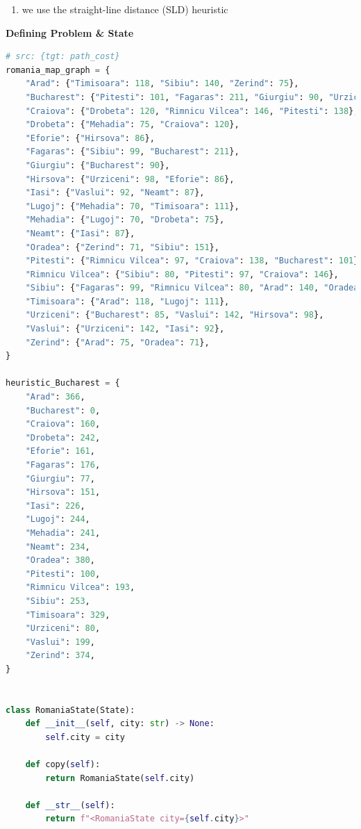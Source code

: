\begin{enumerate}[itemsep=0.2cm]
    \item we use the straight-line distance (SLD) heuristic
    \hfill \cite{ai/book/Artificial-Intelligence-A-Modern-Approach/Russell-Norvig}
\end{enumerate}


\vspace{0.5cm}

{\centering \textbf{Defining Problem \& State} \par}

\begin{lstlisting}[language=Python]
# src: {tgt: path_cost}
romania_map_graph = {
    "Arad": {"Timisoara": 118, "Sibiu": 140, "Zerind": 75},
    "Bucharest": {"Pitesti": 101, "Fagaras": 211, "Giurgiu": 90, "Urziceni": 85},
    "Craiova": {"Drobeta": 120, "Rimnicu Vilcea": 146, "Pitesti": 138},
    "Drobeta": {"Mehadia": 75, "Craiova": 120},
    "Eforie": {"Hirsova": 86},
    "Fagaras": {"Sibiu": 99, "Bucharest": 211},
    "Giurgiu": {"Bucharest": 90},
    "Hirsova": {"Urziceni": 98, "Eforie": 86},
    "Iasi": {"Vaslui": 92, "Neamt": 87},
    "Lugoj": {"Mehadia": 70, "Timisoara": 111},
    "Mehadia": {"Lugoj": 70, "Drobeta": 75},
    "Neamt": {"Iasi": 87},
    "Oradea": {"Zerind": 71, "Sibiu": 151},
    "Pitesti": {"Rimnicu Vilcea": 97, "Craiova": 138, "Bucharest": 101},
    "Rimnicu Vilcea": {"Sibiu": 80, "Pitesti": 97, "Craiova": 146},
    "Sibiu": {"Fagaras": 99, "Rimnicu Vilcea": 80, "Arad": 140, "Oradea": 151},
    "Timisoara": {"Arad": 118, "Lugoj": 111},
    "Urziceni": {"Bucharest": 85, "Vaslui": 142, "Hirsova": 98},
    "Vaslui": {"Urziceni": 142, "Iasi": 92},
    "Zerind": {"Arad": 75, "Oradea": 71},
}

heuristic_Bucharest = {
    "Arad": 366,
    "Bucharest": 0,
    "Craiova": 160,
    "Drobeta": 242,
    "Eforie": 161,
    "Fagaras": 176,
    "Giurgiu": 77,
    "Hirsova": 151,
    "Iasi": 226,
    "Lugoj": 244,
    "Mehadia": 241,
    "Neamt": 234,
    "Oradea": 380,
    "Pitesti": 100,
    "Rimnicu Vilcea": 193,
    "Sibiu": 253,
    "Timisoara": 329,
    "Urziceni": 80,
    "Vaslui": 199,
    "Zerind": 374,
}


class RomaniaState(State):
    def __init__(self, city: str) -> None:
        self.city = city

    def copy(self):
        return RomaniaState(self.city)
    
    def __str__(self):
        return f"<RomaniaState city={self.city}>"


\end{lstlisting}
